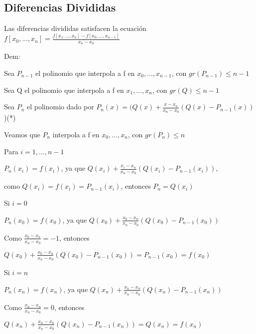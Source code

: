 \documentclass{article}
\begin{document}
\vspace{10mm}

\subsection{Diferencias Divididas}\label{Relacion-recursiva-de-Diferencias-Divididas}

Las diferencias divididas satisfacen la ecuación $f[x_0,...,x_n] = \frac{f[x_1,...,x_n] - f[x_0,...,x_{n-1}]}{x_n - x_0}$

\vspace{5mm}

Dem:

Sea $P_{n-1}$ el polinomio que interpola a f en $x_0,...,x_{n-1}$, con $gr(P_{n-1}) \leq n-1$

Sea Q el polinomio que interpola a f en $x_1,...,x_n$, con $gr(Q) \leq n-1$

Sea $P_n$ el polinomio dado por $P_n(x) = (Q(x)+\frac{x-x_n}{x_n-x_0}(Q(x) - P_{n-1}(x))$)(*)

\vspace{5mm}

Veamos que $P_n$ interpola a f en $x_0,...,x_n$, con $gr(P_n) \leq n$

Para $i = 1,...,n-1$

$P_n(x_i) = f(x_i)$, ya que $Q(x_i) + \frac{x_i-x_n}{x_n-x_0}(Q(x_i)-P_{n-1}(x_i))$,

como $Q(x_i) = f(x_i) = P_{n-1}(x_i)$, entonces $P_n = Q(x_i)$

\vspace{5mm}

Si $i = 0$

$P_n(x_0) = f(x_0)$, ya que $Q(x_0)+\frac{x_0-x_n}{x_n-x_0}(Q(x_0)-P_{n-1}(x_0))$

Como $\frac{x_0-x_n}{x_n-x_0} = -1$, entonces

$Q(x_0)+\frac{x_0-x_n}{x_n-x_0}(Q(x_0)-P_{n-1}(x_0)) = P_{n-1}(x_0) = f(x_0)$  

\vspace{5mm}

Si $i = n$

$P_n(x_n) = f(x_n)$, ya que $Q(x_n)+\frac{x_n-x_n}{x_n-x_0}(Q(x_n)-P_{n-1}(x_n))$

Como $\frac{x_n-x_n}{x_n-x_0} = 0$, entonces

$Q(x_n)+\frac{x_n-x_n}{x_n-x_0}(Q(x_n)-P_{n-1}(x_n)) = Q(x_n) = f(x_n)$ 

\vspace{5mm}
\end{document}
